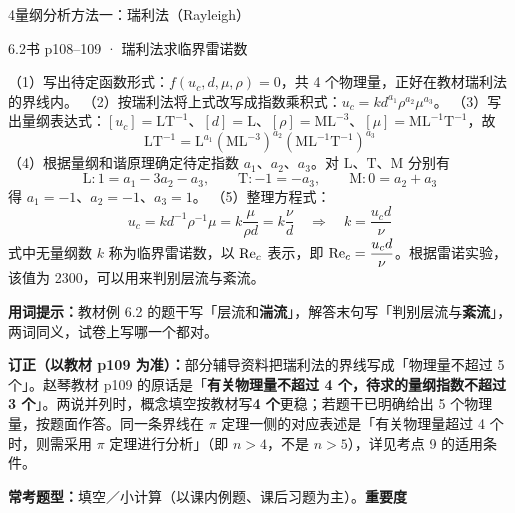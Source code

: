 \begin{kaodian}{4}{量纲分析方法一：瑞利法（Rayleigh）}
\begin{liti}{6.2}{书 p108--109 · 瑞利法求临界雷诺数}
\begin{jie}
（1）写出待定函数形式：$f(u_c,d,\mu,\rho)=0$，共 4 个物理量，正好在教材瑞利法的界线内。
（2）按瑞利法将上式改写成指数乘积式：$u_c=k d^{a_1}\rho^{a_2}\mu^{a_3}$。
（3）写出量纲表达式：$[u_c]=\mathrm{LT^{-1}}$、$[d]=\mathrm{L}$、$[\rho]=\mathrm{ML^{-3}}$、$[\mu]=\mathrm{ML^{-1}T^{-1}}$，故
\[ \mathrm{LT^{-1}}=\mathrm{L}^{a_1}\left(\mathrm{ML^{-3}}\right)^{a_2}\left(\mathrm{ML^{-1}T^{-1}}\right)^{a_3} \]
（4）根据量纲和谐原理确定待定指数 $a_1$、$a_2$、$a_3$。对 $\mathrm{L}$、$\mathrm{T}$、$\mathrm{M}$ 分别有
\[ \mathrm{L}:1=a_1-3a_2-a_3,\qquad \mathrm{T}:-1=-a_3,\qquad \mathrm{M}:0=a_2+a_3 \]
得 $a_1=-1$、$a_2=-1$、$a_3=1$。
（5）整理方程式：
\[ u_c=k d^{-1}\rho^{-1}\mu=k\frac{\mu}{\rho d}=k\frac{\nu}{d}\quad\Longrightarrow\quad k=\frac{u_c d}{\nu} \]
式中无量纲数 $k$ 称为临界雷诺数，以 $\mathrm{Re}_c$ 表示，即 $\mathrm{Re}_c=\dfrac{u_c d}{\nu}$。根据雷诺实验，该值为 2300，可以用来判别层流与紊流。
\end{jie}

\begin{tishi}
\textbf{用词提示：}教材例 6.2 的题干写「层流和\textbf{湍流}」，解答末句写「判别层流与\textbf{紊流}」，两词同义，试卷上写哪一个都对。
\end{tishi}
\end{liti}

\begin{tishi}
\textbf{订正（以教材 p109 为准）：}部分辅导资料把瑞利法的界线写成「物理量不超过 5 个」。赵琴教材 p109 的原话是「\textbf{有关物理量不超过 4 个，待求的量纲指数不超过 3 个}」。两说并列时，概念填空按教材写\textbf{4 个}更稳；若题干已明确给出 5 个物理量，按题面作答。同一条界线在 $\pi$ 定理一侧的对应表述是「有关物理量超过 4 个时，则需采用 $\pi$ 定理进行分析」（即 $n>4$，不是 $n>5$），详见考点 9 的适用条件。
\end{tishi}

\textbf{常考题型：}填空／小计算（以课内例题、课后习题为主）。\quad\textbf{重要度 }\quad{}\quad{}
\end{kaodian}

